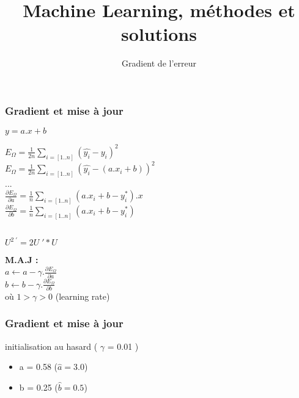 \documentclass{formation}
\title{Machine Learning, méthodes et solutions}
\subtitle{Gradient de l'erreur}
\begin{document}
\maketitle

\begin{frame}
  \frametitle{Gradient et mise à jour}
  \begin{minipage}[l]{0.49\linewidth}
    \begin{center}
      $\boxed{y = a.x+b}$ \\
    \end{center}
    $E_{\Omega} = \frac{1}{2n}\underset{i=[1..n]}{\sum}( \hat{y_i} - y_i )^2$ \\
    $E_{\Omega} = \frac{1}{2n}\underset{i=[1..n]}{\sum}( \hat{y_i} - (a.x_i+b) )^2$ \\
    ... \\
    $\frac{\partial{E_{\Omega}}}{\partial{a}} = \frac{1}{n}\sum_{i=[1..n]}(a.x_i+b - y_i^*).x$ \\
    $\frac{\partial{E_{\Omega}}}{\partial{b}} = \frac{1}{n}\sum_{i=[1..n]}(a.x_i+b - y_i^*)$ \\
  \end{minipage}\hfill
  \begin{minipage}[c]{0.49\linewidth}
    $\;$ \\
    $\;$ \\
    $\;$ \\
    \begin{center}
      $\boxed{U^{2\;\prime}=2U\;'*U}$
    \end{center}
  \end{minipage}\hfill
  \begin{center}
    \textbf{M.A.J :} \\
    $\;$ \\
    $a \leftarrow a - \gamma.\frac{\partial{E_{\Omega}}}{\partial{a}}$ \\
    $b \leftarrow b - \gamma.\frac{\partial{E_{\Omega}}}{\partial{b}}$ \\
    $\;$ \\
    où $1 > \gamma > 0$ (learning rate)
  \end{center}
\end{frame}

\begin{frame}
  \frametitle{Gradient et mise à jour}
  initialisation au hasard ( $\gamma$ = 0.01 )
  \begin{itemize}
  \item a = 0.58 ($\hat{a} = 3.0$)
  \item b = 0.25 ($\hat{b} = 0.5$)
  \end{itemize}
\end{frame}
\end{document}
